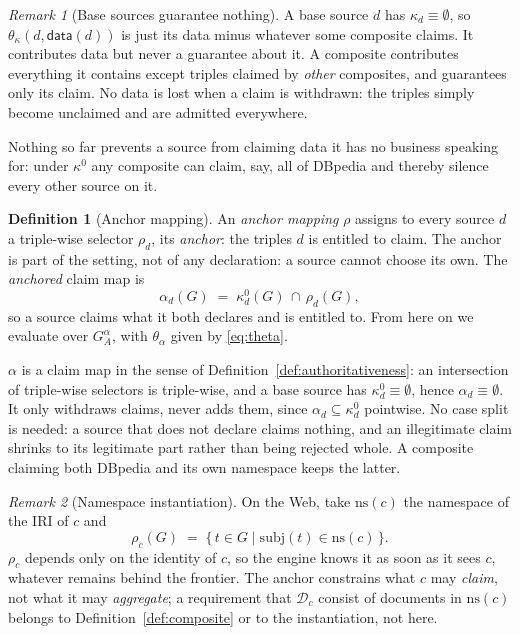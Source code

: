 \documentclass[11pt,a4paper]{article}
\theoremstyle{definition}
\newtheorem{definition}{Definition}
\theoremstyle{plain}
\theoremstyle{remark}
\newtheorem*{remark}{Remark}
\newcommand{\Dd}{\mathcal{D}}
\newcommand{\dataf}{\mathsf{data}}
\begin{document}
\begin{remark}[Base sources guarantee nothing]
A base source $d$ has $\kappa_d \equiv \emptyset$, so $\theta_\kappa(d, \dataf(d))$ is
just its data minus whatever some composite claims. It contributes data but never a
guarantee about it. A composite contributes everything it contains except triples
claimed by \emph{other} composites, and guarantees only its claim. No data is lost
when a claim is withdrawn: the triples simply become unclaimed and are admitted
everywhere.
\end{remark}

\noindent
Nothing so far prevents a source from claiming data it has no business speaking for:
under $\kappa^0$ any composite can claim, say, all of DBpedia and thereby silence every
other source on it.

\begin{definition}[Anchor mapping]
\label{def:anchor}
An \emph{anchor mapping} $\rho$ assigns to every source $d$ a triple-wise selector
$\rho_d$, its \emph{anchor}: the triples $d$ is entitled to claim. The anchor is part
of the setting, not of any declaration: a source cannot choose its own. The
\emph{anchored} claim map is
\[
  \alpha_d(G) \;=\; \kappa^{0}_d(G) \,\cap\, \rho_d(G),
\]
so a source claims what it both declares and is entitled to. From here on we evaluate
over $G^{\alpha}_A$, with $\theta_\alpha$ given by \eqref{eq:theta}.
\end{definition}

\noindent
$\alpha$ is a claim map in the sense of Definition~\ref{def:authoritativeness}: an
intersection of triple-wise selectors is triple-wise, and a base source has
$\kappa^0_d \equiv \emptyset$, hence $\alpha_d \equiv \emptyset$. It only withdraws
claims, never adds them, since $\alpha_d \subseteq \kappa^0_d$ pointwise. No case split
is needed: a source that does not declare claims nothing, and an illegitimate claim
shrinks to its legitimate part rather than being rejected whole. A composite claiming
both DBpedia and its own namespace keeps the latter.

\begin{remark}[Namespace instantiation]
On the Web, take $\mathrm{ns}(c)$ the namespace of the IRI of $c$ and
\[
  \rho_c(G) \;=\; \{\, t \in G \mid \mathrm{subj}(t) \in \mathrm{ns}(c) \,\}.
\]
$\rho_c$ depends only on the identity of $c$, so the engine knows it as soon as it
sees $c$, whatever remains behind the frontier. The anchor constrains what $c$ may
\emph{claim}, not what it may \emph{aggregate}; a requirement that $\Dd_c$ consist of
documents in $\mathrm{ns}(c)$ belongs to Definition~\ref{def:composite} or to the
instantiation, not here.
\end{remark}
\end{document}
